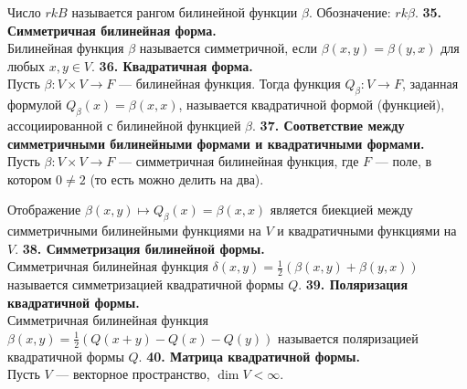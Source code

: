 \documentclass{article}
\begin{document}
Число $rk B$ называется рангом билинейной функции $\beta$. Обозначение: $rk \beta$.
\newline
\newline
\textbf{35. Симметричная билинейная форма.}\\
Билинейная функция $\beta$ называется симметричной, если $\beta(x, y) =\beta(y, x)$ для любых $x, y \in V$.
\newline
\newline
\textbf{36. Квадратичная форма.}\\
Пусть $\beta \colon V\times V \rightarrow F$ --- билинейная функция. Тогда функция $Q_\beta \colon V \rightarrow F$, заданная формулой $Q_\beta(x) = \beta(x, x)$, называется квадратичной формой (функцией), ассоциированной с билинейной функцией $\beta$.
\newline
\newline
\textbf{37. Соответствие между симметричными билинейными формами и квадратичными формами.}\\
Пусть $\beta \colon V\times V \rightarrow F$ --- симметричная билинейная функция, где $F$ --- поле, в котором $0 \neq 2$ (то есть можно делить на два).

Отображение $\beta(x, y) \mapsto Q_\beta(x) = \beta(x, x)$ является биекцией между симметричными билинейными функциями на $V$ и квадратичными функциями на $V$.
\newline
\newline
\textbf{38. Симметризация билинейной формы.}\\
Симметричная билинейная функция $\delta(x, y) = \frac{1}{2}\left( \beta(x,y)+\beta(y,x)  \right)$ называется симметризацией квадратичной формы $Q$.
\newline
\newline
\textbf{39. Поляризация квадратичной формы.}\\
Симметричная билинейная функция $\beta(x, y) = \frac{1}{2}\left( Q(x + y) - Q(x) - Q(y)  \right)$ называется поляризацией квадратичной формы $Q$.
\newline
\newline
\textbf{40. Матрица квадратичной формы.}\\
Пусть $V$ --- векторное пространство, $\dim V < \infty$.
\end{document}
